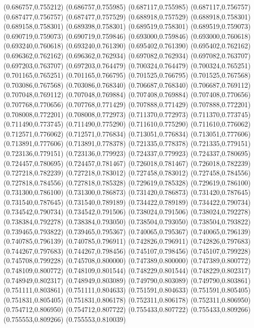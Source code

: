 (0.686757,0.755212)
(0.686757,0.755985)
(0.687117,0.755985)
(0.687117,0.756757)
(0.687477,0.756757)
(0.687477,0.757529)
(0.688918,0.757529)
(0.688918,0.758301)
(0.689158,0.758301)
(0.689398,0.758301)
(0.689519,0.758301)
(0.689519,0.759073)
(0.690719,0.759073)
(0.690719,0.759846)
(0.693000,0.759846)
(0.693000,0.760618)
(0.693240,0.760618)
(0.693240,0.761390)
(0.695402,0.761390)
(0.695402,0.762162)
(0.696362,0.762162)
(0.696362,0.762934)
(0.697082,0.762934)
(0.697082,0.763707)
(0.697203,0.763707)
(0.697203,0.764479)
(0.700324,0.764479)
(0.700324,0.765251)
(0.701165,0.765251)
(0.701165,0.766795)
(0.701525,0.766795)
(0.701525,0.767568)
(0.703086,0.767568)
(0.703086,0.768340)
(0.706687,0.768340)
(0.706687,0.769112)
(0.707048,0.769112)
(0.707048,0.769884)
(0.707408,0.769884)
(0.707408,0.770656)
(0.707768,0.770656)
(0.707768,0.771429)
(0.707888,0.771429)
(0.707888,0.772201)
(0.708008,0.772201)
(0.708008,0.772973)
(0.711370,0.772973)
(0.711370,0.773745)
(0.711490,0.773745)
(0.711490,0.775290)
(0.711610,0.775290)
(0.711610,0.776062)
(0.712571,0.776062)
(0.712571,0.776834)
(0.713051,0.776834)
(0.713051,0.777606)
(0.713891,0.777606)
(0.713891,0.778378)
(0.721335,0.778378)
(0.721335,0.779151)
(0.723136,0.779151)
(0.723136,0.779923)
(0.724337,0.779923)
(0.724337,0.780695)
(0.724457,0.780695)
(0.724457,0.781467)
(0.726018,0.781467)
(0.726018,0.782239)
(0.727218,0.782239)
(0.727218,0.783012)
(0.727458,0.783012)
(0.727458,0.784556)
(0.727818,0.784556)
(0.727818,0.785328)
(0.729619,0.785328)
(0.729619,0.786100)
(0.731300,0.786100)
(0.731300,0.786873)
(0.731420,0.786873)
(0.731420,0.787645)
(0.731540,0.787645)
(0.731540,0.789189)
(0.734422,0.789189)
(0.734422,0.790734)
(0.734542,0.790734)
(0.734542,0.791506)
(0.738024,0.791506)
(0.738024,0.792278)
(0.738384,0.792278)
(0.738384,0.793050)
(0.738504,0.793050)
(0.738504,0.793822)
(0.739465,0.793822)
(0.739465,0.795367)
(0.740065,0.795367)
(0.740065,0.796139)
(0.740785,0.796139)
(0.740785,0.796911)
(0.742826,0.796911)
(0.742826,0.797683)
(0.744267,0.797683)
(0.744267,0.798456)
(0.745107,0.798456)
(0.745107,0.799228)
(0.745708,0.799228)
(0.745708,0.800000)
(0.747389,0.800000)
(0.747389,0.800772)
(0.748109,0.800772)
(0.748109,0.801544)
(0.748229,0.801544)
(0.748229,0.802317)
(0.748949,0.802317)
(0.748949,0.803089)
(0.749790,0.803089)
(0.749790,0.803861)
(0.751111,0.803861)
(0.751111,0.804633)
(0.751591,0.804633)
(0.751591,0.805405)
(0.751831,0.805405)
(0.751831,0.806178)
(0.752311,0.806178)
(0.752311,0.806950)
(0.754712,0.806950)
(0.754712,0.807722)
(0.755433,0.807722)
(0.755433,0.809266)
(0.755553,0.809266)
(0.755553,0.810039)
